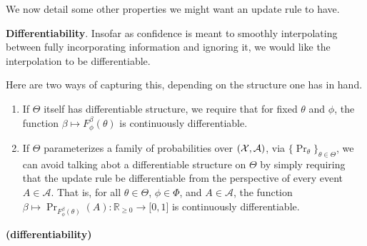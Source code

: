 \documentclass{article}
\begin{document}
We now detail some other properties we might want an update rule to have.

\textbf{Differentiability}.
Insofar as confidence is meant to smoothly interpolating between fully incorporating information and ignoring it, we would like the interpolation to be differentiable.

Here are two ways of capturing this, depending on the structure one has in hand.


\begin{URaxioms}
    \item
    \begin{enumerate}
    \item If $\Theta$ itself has differentiable structure, we require that
        for fixed $\theta$ and $\phi$, the function $\beta \mapsto F^{\beta}_\phi(\theta)$
        is continuously differentiable. \label{ax:diffble}
    \item If $\Theta$ parameterizes a family of probabilities over $(\mathcal X, \mathcal A)$,
        via $\{ \Pr_\theta \}_{\theta \in \Theta}$, we can avoid talking abot a differentiable structure on $\Theta$ by simply requiring that the update rule be differentiable from the perspective of every event $A \in \mathcal A$.
        That is,
        for all $\theta \in \Theta$, $\phi \in \Phi$, and  $A \in \mathcal A$,
        the function $\beta \mapsto \Pr_{F^{\beta}_\phi(\theta)}(A)
        : \mathbb R_{\ge 0} \to \mathbb [0,1]$ is
        continuously differentiable.
            \label{ax:diffble2}
    \end{enumerate}
    \hfill \textbf{(differentiability)}
\end{URaxioms}

\end{document}
